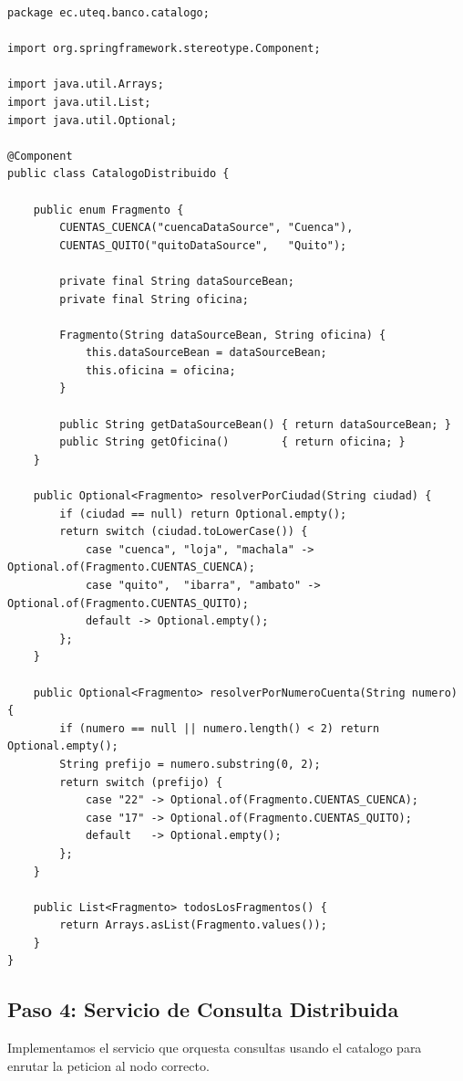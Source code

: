 \documentclass[11pt,a4paper]{article}
\begin{document}
\begin{lstlisting}[style=JavaStyle,caption={CatalogoDistribuido.java: gestion de metadatos de fragmentos}]
package ec.uteq.banco.catalogo;

import org.springframework.stereotype.Component;

import java.util.Arrays;
import java.util.List;
import java.util.Optional;

@Component
public class CatalogoDistribuido {

    public enum Fragmento {
        CUENTAS_CUENCA("cuencaDataSource", "Cuenca"),
        CUENTAS_QUITO("quitoDataSource",   "Quito");

        private final String dataSourceBean;
        private final String oficina;

        Fragmento(String dataSourceBean, String oficina) {
            this.dataSourceBean = dataSourceBean;
            this.oficina = oficina;
        }

        public String getDataSourceBean() { return dataSourceBean; }
        public String getOficina()        { return oficina; }
    }

    public Optional<Fragmento> resolverPorCiudad(String ciudad) {
        if (ciudad == null) return Optional.empty();
        return switch (ciudad.toLowerCase()) {
            case "cuenca", "loja", "machala" -> Optional.of(Fragmento.CUENTAS_CUENCA);
            case "quito",  "ibarra", "ambato" -> Optional.of(Fragmento.CUENTAS_QUITO);
            default -> Optional.empty();
        };
    }

    public Optional<Fragmento> resolverPorNumeroCuenta(String numero) {
        if (numero == null || numero.length() < 2) return Optional.empty();
        String prefijo = numero.substring(0, 2);
        return switch (prefijo) {
            case "22" -> Optional.of(Fragmento.CUENTAS_CUENCA);
            case "17" -> Optional.of(Fragmento.CUENTAS_QUITO);
            default   -> Optional.empty();
        };
    }

    public List<Fragmento> todosLosFragmentos() {
        return Arrays.asList(Fragmento.values());
    }
}
\end{lstlisting}

\subsection{Paso 4: Servicio de Consulta Distribuida}

Implementamos el servicio que orquesta consultas usando el catalogo para enrutar la peticion al nodo correcto.
\end{document}
